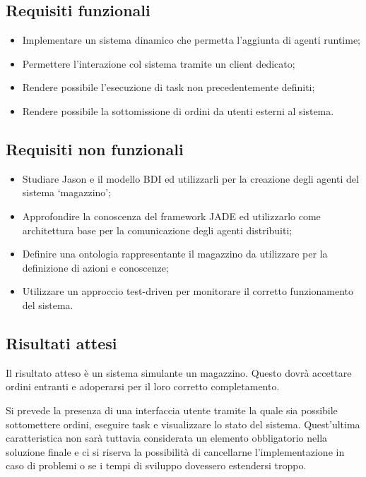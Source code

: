 \subsection{Requisiti funzionali}
\begin{itemize}
    \item Implementare un sistema dinamico che permetta l'aggiunta di agenti runtime;
    \item Permettere l'interazione col sistema tramite un client dedicato;
    \item Rendere possibile l'esecuzione di task non precedentemente definiti;
    \item Rendere possibile la sottomissione di ordini da utenti esterni al sistema.
\end{itemize}

\subsection{Requisiti non funzionali}
\begin{itemize}
    \item Studiare Jason e il modello BDI ed utilizzarli per la creazione degli agenti del sistema `magazzino';
    \item Approfondire la conoscenza del framework JADE ed utilizzarlo come architettura base per la comunicazione degli agenti distribuiti;
    \item Definire una ontologia rappresentante il magazzino da utilizzare per la definizione di azioni e conoscenze;
    \item Utilizzare un approccio test-driven per monitorare il corretto funzionamento del sistema.
\end{itemize}

\subsection{Risultati attesi}
Il risultato atteso è un sistema simulante un magazzino. Questo dovrà accettare ordini entranti e adoperarsi per il loro corretto completamento.

Si prevede la presenza di una interfaccia utente tramite la quale sia possibile sottomettere ordini, eseguire task e visualizzare lo stato del sistema. Quest'ultima caratteristica non sarà tuttavia considerata un elemento obbligatorio nella soluzione finale e ci si riserva la possibilità di cancellarne l'implementazione in caso di problemi o se i tempi di sviluppo dovessero estendersi troppo.

